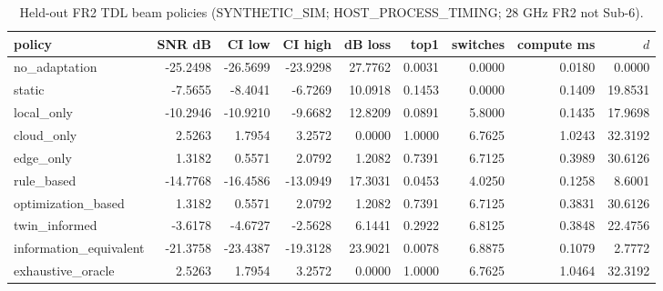 \begin{table}[h]\centering
\caption{Held-out FR2 TDL beam policies (SYNTHETIC\_SIM; HOST\_PROCESS\_TIMING; 28 GHz FR2 not Sub-6).}
\begin{tabular}{lrrrrrrrr}\toprule
policy & SNR dB & CI low & CI high & dB loss & top1 & switches & compute ms & $d$ \\
\midrule
no\_adaptation & -25.2498 & -26.5699 & -23.9298 & 27.7762 & 0.0031 & 0.0000 & 0.0180 & 0.0000 \\
static & -7.5655 & -8.4041 & -6.7269 & 10.0918 & 0.1453 & 0.0000 & 0.1409 & 19.8531 \\
local\_only & -10.2946 & -10.9210 & -9.6682 & 12.8209 & 0.0891 & 5.8000 & 0.1435 & 17.9698 \\
cloud\_only & 2.5263 & 1.7954 & 3.2572 & 0.0000 & 1.0000 & 6.7625 & 1.0243 & 32.3192 \\
edge\_only & 1.3182 & 0.5571 & 2.0792 & 1.2082 & 0.7391 & 6.7125 & 0.3989 & 30.6126 \\
rule\_based & -14.7768 & -16.4586 & -13.0949 & 17.3031 & 0.0453 & 4.0250 & 0.1258 & 8.6001 \\
optimization\_based & 1.3182 & 0.5571 & 2.0792 & 1.2082 & 0.7391 & 6.7125 & 0.3831 & 30.6126 \\
twin\_informed & -3.6178 & -4.6727 & -2.5628 & 6.1441 & 0.2922 & 6.8125 & 0.3848 & 22.4756 \\
information\_equivalent & -21.3758 & -23.4387 & -19.3128 & 23.9021 & 0.0078 & 6.8875 & 0.1079 & 2.7772 \\
exhaustive\_oracle & 2.5263 & 1.7954 & 3.2572 & 0.0000 & 1.0000 & 6.7625 & 1.0464 & 32.3192 \\
\bottomrule\end{tabular}
\end{table}
